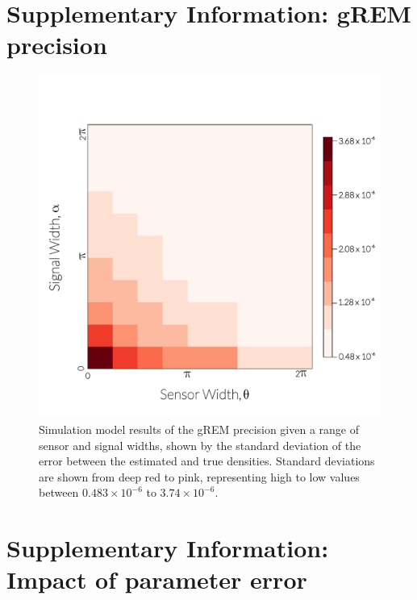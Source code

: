 

\vspace{1cm}




\clearpage
\section{Supplementary Information: gREM precision}
\setcounter{figure}{0}    




\begin{figure}[h!]
  \centering
	\includegraphics[width=\textwidth]{imgs/ResultStandardDeviation.pdf}
	\caption[gREM precision given a range of sensor and signal widths]{
Simulation model results of the gREM precision given a range of sensor and signal widths, shown by the standard deviation of the error between the estimated and true densities. 
Standard deviations are shown from deep red to pink, representing high to low values between $0.483\times10^{-6}$ to $3.74\times10^{-6}$. 
        } 
	\label{f:StandardDeviation}
\end{figure}


\clearpage
\section{Supplementary Information: Impact of parameter error}




